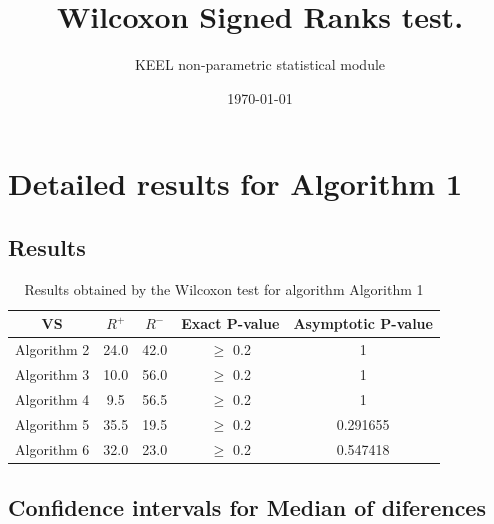 \documentclass[a4paper,10pt]{article}
\title{Wilcoxon Signed Ranks test.}
\date{\today}
\author{KEEL non-parametric statistical module}
\begin{document}
\pagestyle{empty}
\maketitle
\thispagestyle{empty}



\section{Detailed results for Algorithm 1}


\subsection{Results}

\begin{table}[!htp]
\centering\small
\begin{tabular}{
|c|c|c|c|c|}
\hline
 VS & $R^{+}$ & $R^{-}$ & Exact P-value & Asymptotic P-value \\ \hline 
Algorithm 2 & 24.0 & 42.0 & $\geq$ 0.2 & 1\\ \hline 
Algorithm 3 & 10.0 & 56.0 & $\geq$ 0.2 & 1\\ \hline 
Algorithm 4 & 9.5 & 56.5 & $\geq$ 0.2 & 1\\ \hline 
Algorithm 5 & 35.5 & 19.5 & $\geq$ 0.2 & 0.291655\\ \hline 
Algorithm 6 & 32.0 & 23.0 & $\geq$ 0.2 & 0.547418\\ \hline 

\end{tabular}
\caption{Results obtained by the Wilcoxon test for algorithm Algorithm 1}
\end{table}

\subsection{Confidence intervals for Median of diferences}
\end{document}
